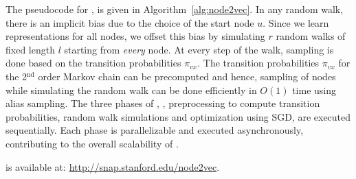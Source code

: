 The pseudocode for \nodevec, is given in Algorithm~\ref{alg:node2vec}. In any random walk, there is an implicit bias due to the choice of the start node $u$. Since we learn representations for all nodes, we offset this bias by simulating $r$ random walks of fixed length $l$ starting from {\em every} node. At every step of the walk, sampling is done based on the transition probabilities $\pi_{vx}$.
The transition probabilities $\pi_{vx}$ for the 2$^{\textrm{nd}}$ order Markov chain can be precomputed and hence, sampling of nodes while simulating the random walk can be done efficiently in $O(1)$ time using alias sampling. The three phases of \nodevec, \ie, preprocessing to compute transition probabilities, random walk simulations and optimization using SGD, are executed sequentially. Each phase is parallelizable and executed asynchronously, contributing to the overall scalability of \nodevec.

\nodevec is available at: \url{http://snap.stanford.edu/node2vec}. 


